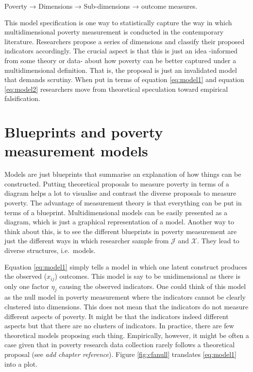 \documentclass[]{book}
\begin{document}
Poverty → Dimensions → Sub-dimensions → outcome measures.

This model specification is one way to statistically capture the way in which multidimensional poverty measurement is conducted in the contemporary literature. Researchers propose a series of dimensions and classify their proposed indicators accordingly. The crucial aspect is that this is just an idea -informed from some theory or data- about how poverty can be better captured under a multidimensional definition. That is, the proposal is just an invalidated model that demands scrutiny. When put in terms of equation \eqref{eq:model1} and equation \eqref{eq:model2} researchers move from theoretical speculation toward empirical falsification.

\hypertarget{blueprints-and-poverty-measurement-models}{%
\section{Blueprints and poverty measurement models}\label{blueprints-and-poverty-measurement-models}}

Models are just blueprints that summarise an explanation of how things can be constructed. Putting theoretical proposals to measure poverty in terms of a diagram helps a lot to visualise and contrast the diverse proposals to measure poverty. The advantage of measurement theory is that everything can be put in terms of a blueprint. Multidimensional models can be easily presented as a diagram, which is just a graphical representation of a model. Another way to think about this, is to see the different blueprints in poverty measurement are just the different ways in which researcher sample from \(\mathscr J\) and \(\mathscr X\). They lead to diverse structures, i.e.~models.

Equation \eqref{eq:model1} simply tells a model in which one latent construct produces the observed (\(x_{ij}\)) outcomes. This model is say to be unidimensional as there is only one factor \(\eta_j\) causing the observed indicators. One could think of this model as the null model in poverty measurement where the indicators cannot be clearly clustered into dimensions. This does not mean that the indicators do not measure different aspects of poverty. It might be that the indicators indeed different aspects but that there are no clusters of indicators. In practice, there are few theoretical models proposing such thing. Empirically, however, it might be often a case given that in poverty research data collection rarely follows a theoretical proposal (see \emph{add chapter reference}). Figure \ref{fig:cfanull} translates \eqref{eq:model1} into a plot.
\end{document}
